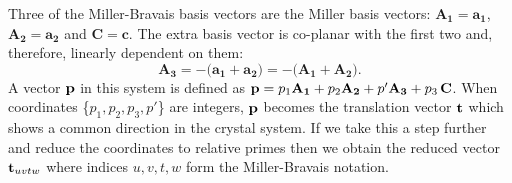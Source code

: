Three of the Miller-Bravais basis vectors are the Miller basis vectors: $\mathbf{A_1}=\mathbf{a_1}$, $\mathbf{A_2}=\mathbf{a_2}$ and $\mathbf{C}=\mathbf{c}$. The extra basis vector is co-planar with the first two and, therefore, linearly dependent on them: 
\begin{equation}
\label{eq:a1a2a3}
\mathbf{A_3} = - (\mathbf{a_1} + \mathbf{a_2)}=- (\mathbf{A_1} + \mathbf{A_2)}. 
\end{equation}
A vector $\vb{p}$ in this system is defined as $\vb{p} = p_1\mathbf{A_1}+p_2\mathbf{A_2}+p'\mathbf{A_3}+p_3\,\mathbf{C}$. When coordinates \{$p_1, p_2, p_3, p'$\} are integers, $\vb{p}$ becomes the translation vector $\vb{t}$ which shows a common direction in the crystal system. If we take this a step further and reduce the coordinates to relative primes then we obtain the reduced vector $\vb{t}_{uvtw}$ where indices $u,v,t,w$ form the Miller-Bravais notation.


